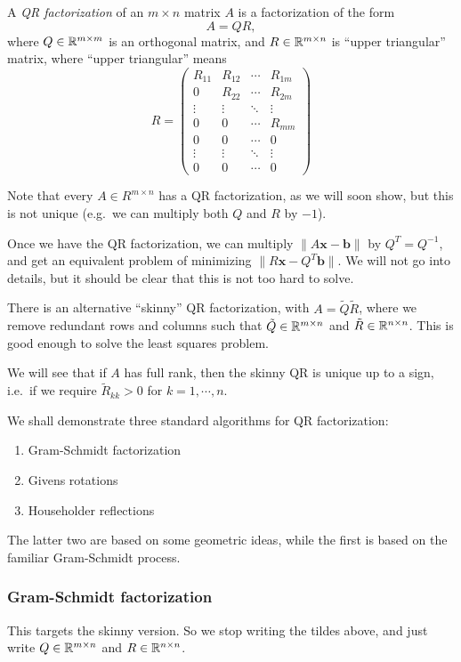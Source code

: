 \documentclass[a4paper]{article}
\begin{document}
\begin{defi}[QR factorization]
  A \emph{QR factorization} of an $m \times n$ matrix $A$ is a factorization of the form
  \[
    A = QR,
  \]
  where $Q \in \mathbb{R}^{m \times m}$ is an orthogonal matrix, and $R \in \mathbb{R}^{m \times n}$ is ``upper triangular'' matrix, where ``upper triangular'' means
  \[
    R =
    \begin{pmatrix}
      R_{11} & R_{12} & \cdots & R_{1m}\\
      0 & R_{22} & \cdots & R_{2m}\\
      \vdots & \vdots & \ddots & \vdots\\
      0 & 0 & \cdots & R_{mm}\\
      0 & 0 & \cdots & 0\\
      \vdots & \vdots & \ddots & \vdots\\
      0 & 0 & \cdots & 0
    \end{pmatrix}
  \]
\end{defi}
Note that every $A \in R^{m \times n}$ has a QR factorization, as we will soon show, but this is not unique (e.g.\ we can multiply both $Q$ and $R$ by $-1$).

Once we have the QR factorization, we can multiply $\|A\mathbf{x} - \mathbf{b}\|$ by $Q^T = Q^{-1}$, and get an equivalent problem of minimizing $\|R \mathbf{x} - Q^T \mathbf{b}\|$. We will not go into details, but it should be clear that this is not too hard to solve.

There is an alternative ``skinny'' QR factorization, with $A = \tilde{Q} \tilde{R}$, where we remove redundant rows and columns such that $\tilde{Q} \in \mathbb{R}^{m \times n}$ and $\tilde{R} \in \mathbb{R}^{n \times n}$. %
This is good enough to solve the least squares problem.

We will see that if $A$ has full rank, then the skinny QR is unique up to a sign, i.e.\ if we require $\tilde{R}_{kk} > 0$ for $k = 1, \cdots, n$.

We shall demonstrate three standard algorithms for QR factorization:
\begin{enumerate}
  \item Gram-Schmidt factorization
  \item Givens rotations
  \item Householder reflections
\end{enumerate}
The latter two are based on some geometric ideas, while the first is based on the familiar Gram-Schmidt process.

\subsubsection*{Gram-Schmidt factorization}
This targets the skinny version. So we stop writing the tildes above, and just write $Q \in \mathbb{R}^{m \times n}$ and $R \in \mathbb{R}^{n \times n}$.
\end{document}

